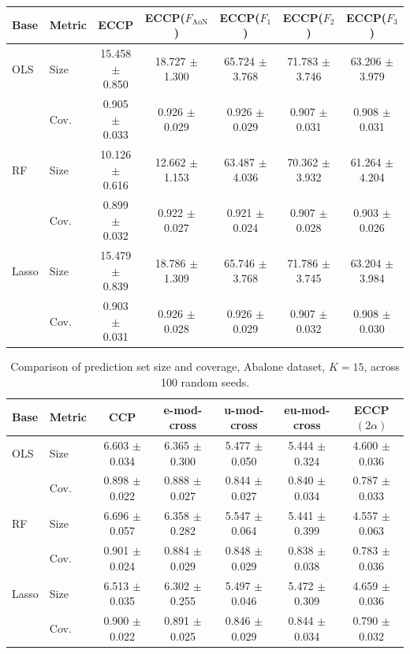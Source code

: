 \documentclass{article}
\theoremstyle{plain}
\theoremstyle{definition}
\theoremstyle{remark}
\begin{document}
\begin{table}[H]
\centering

\begin{tabular}{llccccc}
\toprule
Base & Metric & ECCP & ECCP($F_{\text{AoN}}$) & ECCP($F_{1}$) & ECCP($F_2$) & ECCP($F_3$) \\
\midrule
OLS & Size & 15.458 $\pm$ 0.850 & 18.727 $\pm$ 1.300 & 65.724 $\pm$ 3.768 & 71.783 $\pm$ 3.746 & 63.206 $\pm$ 3.979 \\
 & Cov. & 0.905 $\pm$ 0.033 & 0.926 $\pm$ 0.029 & 0.926 $\pm$ 0.029 & 0.907 $\pm$ 0.031 & 0.908 $\pm$ 0.031 \\
\midrule
RF & Size & 10.126 $\pm$ 0.616 & 12.662 $\pm$ 1.153 & 63.487 $\pm$ 4.036 & 70.362 $\pm$ 3.932 & 61.264 $\pm$ 4.204 \\
 & Cov. & 0.899 $\pm$ 0.032 & 0.922 $\pm$ 0.027 & 0.921 $\pm$ 0.024 & 0.907 $\pm$ 0.028 & 0.903 $\pm$ 0.026 \\
\midrule
Lasso & Size & 15.479 $\pm$ 0.839 & 18.786 $\pm$ 1.309 & 65.746 $\pm$ 3.768 & 71.786 $\pm$ 3.745 & 63.204 $\pm$ 3.984 \\
 & Cov. & 0.903 $\pm$ 0.031 & 0.926 $\pm$ 0.028 & 0.926 $\pm$ 0.029 & 0.907 $\pm$ 0.032 & 0.908 $\pm$ 0.030 \\
\bottomrule
\end{tabular}
\end{table}


\begin{table}[H]
\centering
\caption{Comparison of prediction set size and coverage, Abalone dataset, $K=15$, across 100 random seeds.}
\begin{tabular}{llccccc}
\toprule
Base & Metric & CCP & e-mod-cross & u-mod-cross & eu-mod-cross & ECCP$(2\alpha)$ \\
\midrule
OLS & Size & 6.603 $\pm$ 0.034 & 6.365 $\pm$ 0.300 & 5.477 $\pm$ 0.050 & 5.444 $\pm$ 0.324 & 4.600 $\pm$ 0.036 \\
 & Cov. & 0.898 $\pm$ 0.022 & 0.888 $\pm$ 0.027 & 0.844 $\pm$ 0.027 & 0.840 $\pm$ 0.034 & 0.787 $\pm$ 0.033 \\
\midrule
RF & Size & 6.696 $\pm$ 0.057 & 6.358 $\pm$ 0.282 & 5.547 $\pm$ 0.064 & 5.441 $\pm$ 0.399 & 4.557 $\pm$ 0.063 \\
 & Cov. & 0.901 $\pm$ 0.024 & 0.884 $\pm$ 0.029 & 0.848 $\pm$ 0.029 & 0.838 $\pm$ 0.038 & 0.783 $\pm$ 0.036 \\
\midrule
Lasso & Size & 6.513 $\pm$ 0.035 & 6.302 $\pm$ 0.255 & 5.497 $\pm$ 0.046 & 5.472 $\pm$ 0.309 & 4.659 $\pm$ 0.036 \\
 & Cov. & 0.900 $\pm$ 0.022 & 0.891 $\pm$ 0.025 & 0.846 $\pm$ 0.029 & 0.844 $\pm$ 0.034 & 0.790 $\pm$ 0.032 \\
\bottomrule
\end{tabular}
\end{table}
\end{document}

